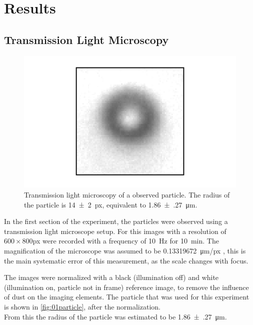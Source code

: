 \documentclass[
    twoside=false,
    twocolumn=true,
    fontsize=11pt,
]{scrarticle}
\begin{document}

\section{Results}
\subsection{Transmission Light Microscopy}
\begin{figure}
    \centering
    \includegraphics{figures/01_01_1_particle.pdf}
    \caption{Transmission light microscopy of a observed particle. The radius of the particle is \SI{14(2)}{px}, equivalent to \SI{1.86(27)}{\micro m}.}
    \label{fig:01particle}
\end{figure}
In the first section of the experiment, the particles were observed using a transmission light microscope setup.
For this images with a resolution of $600\times 800$\si{px} were recorded with a frequency of \SI{10}{Hz} for \SI{10}{min}.
The magnification of the microscope was assumed to be \SI{0.13319672}{\micro m/px} \cite{instructions}, this is the main systematic error of this measurement, as the scale changes with focus.

The images were normalized with a black (illumination off) and white (illumination on, particle not in frame) reference image, to remove the influence of dust on the imaging elements.
The particle that was used for this experiment is shown in \autoref{fig:01particle}, after the normalization.\\
From this the radius of the particle was estimated to be \SI{1.86(27)}{\micro m}.
\end{document}
